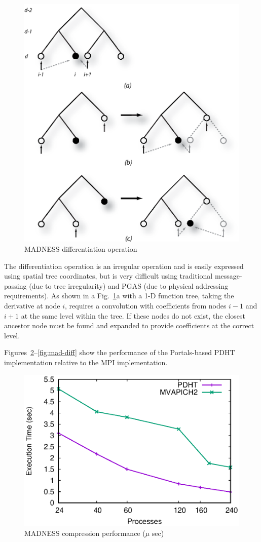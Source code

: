 \begin{figure}
  \centering
  \includegraphics[width=.75\linewidth]{figs/diff}
  \caption{MADNESS differentiation operation}
  \label{fig:diff}
\end{figure}


The differentiation operation is an irregular operation and is easily expressed
using spatial tree coordinates, but is very difficult using traditional
message-passing (due to tree irregularity) and PGAS (due to physical addressing
requirements). As shown in a Fig.~\ref{fig:diff}a with a 1-D function tree,
taking the derivative at node $i$, requires a convolution with coefficients
from nodes $i-1$ and $i+1$ at the same level within the tree. If these nodes
do not exist, the closest ancestor node must be found and expanded to provide
coefficients at the correct level. 


Figures~\ref{fig:mad-compress}--\ref{fig:mad-diff} show the performance of the
Portals-based PDHT implementation relative to the MPI implementation.

\begin{figure}
  \centering
  \includegraphics[width=.9\linewidth]{plots/compress}
  \caption{MADNESS compression performance ($\mu$ sec)}
  \label{fig:mad-compress}
\end{figure}


